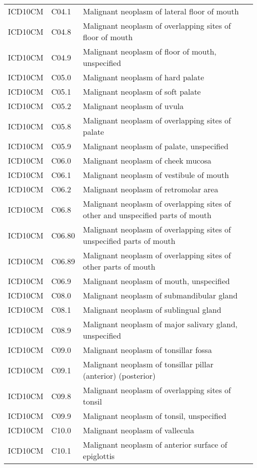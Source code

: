 \begin{table}[ht]
\begin{tabular}{lll}
  ICD10CM & C04.1 & Malignant neoplasm of lateral floor of mouth \\ 
  ICD10CM & C04.8 & Malignant neoplasm of overlapping sites of floor of mouth \\ 
  ICD10CM & C04.9 & Malignant neoplasm of floor of mouth, unspecified \\ 
  ICD10CM & C05.0 & Malignant neoplasm of hard palate \\ 
  ICD10CM & C05.1 & Malignant neoplasm of soft palate \\ 
  ICD10CM & C05.2 & Malignant neoplasm of uvula \\ 
  ICD10CM & C05.8 & Malignant neoplasm of overlapping sites of palate \\ 
  ICD10CM & C05.9 & Malignant neoplasm of palate, unspecified \\ 
  ICD10CM & C06.0 & Malignant neoplasm of cheek mucosa \\ 
  ICD10CM & C06.1 & Malignant neoplasm of vestibule of mouth \\ 
  ICD10CM & C06.2 & Malignant neoplasm of retromolar area \\ 
  ICD10CM & C06.8 & Malignant neoplasm of overlapping sites of other and unspecified parts of mouth \\ 
  ICD10CM & C06.80 & Malignant neoplasm of overlapping sites of unspecified parts of mouth \\ 
  ICD10CM & C06.89 & Malignant neoplasm of overlapping sites of other parts of mouth \\ 
  ICD10CM & C06.9 & Malignant neoplasm of mouth, unspecified \\ 
  ICD10CM & C08.0 & Malignant neoplasm of submandibular gland \\ 
  ICD10CM & C08.1 & Malignant neoplasm of sublingual gland \\ 
  ICD10CM & C08.9 & Malignant neoplasm of major salivary gland, unspecified \\ 
  ICD10CM & C09.0 & Malignant neoplasm of tonsillar fossa \\ 
  ICD10CM & C09.1 & Malignant neoplasm of tonsillar pillar (anterior) (posterior) \\ 
  ICD10CM & C09.8 & Malignant neoplasm of overlapping sites of tonsil \\ 
  ICD10CM & C09.9 & Malignant neoplasm of tonsil, unspecified \\ 
  ICD10CM & C10.0 & Malignant neoplasm of vallecula \\ 
  ICD10CM & C10.1 & Malignant neoplasm of anterior surface of epiglottis \\ 

\end{tabular}
\end{table}
